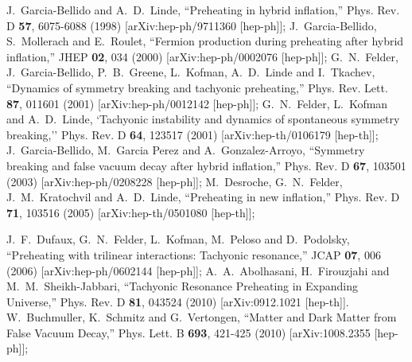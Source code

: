 \documentclass[%
aps,prd,nofootinbib,showkeys,a4paper,10pt
]{revtex4-2}
\begin{document}
\begin{thebibliography}{10}
  
 
  


J.~Garcia-Bellido and A.~D.~Linde,
``Preheating in hybrid inflation,''
Phys. Rev. D \textbf{57}, 6075-6088 (1998)
[arXiv:hep-ph/9711360 [hep-ph]];
J.~Garcia-Bellido, S.~Mollerach and E.~Roulet,
``Fermion production during preheating after hybrid inflation,''
JHEP \textbf{02}, 034 (2000)
[arXiv:hep-ph/0002076 [hep-ph]];
G.~N.~Felder, J.~Garcia-Bellido, P.~B.~Greene, L.~Kofman, A.~D.~Linde and I.~Tkachev,
``Dynamics of symmetry breaking and tachyonic preheating,''
Phys. Rev. Lett. \textbf{87}, 011601 (2001)
[arXiv:hep-ph/0012142 [hep-ph]];
G.~N.~Felder, L.~Kofman and A.~D.~Linde,
`Tachyonic instability and dynamics of spontaneous symmetry breaking,''
Phys. Rev. D \textbf{64}, 123517 (2001)
[arXiv:hep-th/0106179 [hep-th]];
J.~Garcia-Bellido, M.~Garcia Perez and A.~Gonzalez-Arroyo,
``Symmetry breaking and false vacuum decay after hybrid inflation,''
Phys. Rev. D \textbf{67}, 103501 (2003)
[arXiv:hep-ph/0208228 [hep-ph]];
M.~Desroche, G.~N.~Felder, J.~M.~Kratochvil and A.~D.~Linde,
``Preheating in new inflation,''
Phys. Rev. D \textbf{71}, 103516 (2005)
[arXiv:hep-th/0501080 [hep-th]];



J.~F.~Dufaux, G.~N.~Felder, L.~Kofman, M.~Peloso and D.~Podolsky,
``Preheating with trilinear interactions: Tachyonic resonance,''
JCAP \textbf{07}, 006 (2006)
[arXiv:hep-ph/0602144 [hep-ph]];
A.~A.~Abolhasani, H.~Firouzjahi and M.~M.~Sheikh-Jabbari,
``Tachyonic Resonance Preheating in Expanding Universe,''
Phys. Rev. D \textbf{81}, 043524 (2010)
[arXiv:0912.1021 [hep-th]].
W.~Buchmuller, K.~Schmitz and G.~Vertongen,
``Matter and Dark Matter from False Vacuum Decay,''
Phys. Lett. B \textbf{693}, 421-425 (2010)
[arXiv:1008.2355 [hep-ph]];




\end{thebibliography}
\end{document}

